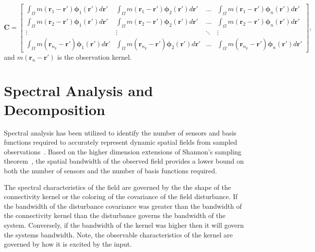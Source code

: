 \documentclass[onecolumn,draftcls]{IEEEtran}
\begin{document}
\begin{equation}
\mathbf C=\begin{bmatrix}\int_{\Omega}m(\mathbf r_1 - \mathbf
r')\boldsymbol \phi_1(\mathbf r')d\mathbf r'&\int_{\Omega}m(\mathbf r_1
- \mathbf r')\boldsymbol \phi_2(\mathbf r')d\mathbf r'& \hdots
&\int_{\Omega}m(\mathbf r_1 - \mathbf r')\boldsymbol \phi_n(\mathbf
r')d\mathbf r' \\
\int_{\Omega}m(\mathbf r_2 - \mathbf r')\boldsymbol \phi_1(\mathbf
r')d\mathbf r'&\int_{\Omega}m(\mathbf r_2 - \mathbf r')\boldsymbol
\phi_2(\mathbf r')d\mathbf r'& \hdots &\int_{\Omega}m(\mathbf r_2 -
\mathbf r')\boldsymbol \phi_n(\mathbf r')d\mathbf r'\\
\vdots&\vdots&\ddots&\vdots\\
\int_{\Omega}m(\mathbf r_{n_y} - \mathbf r')\boldsymbol \phi_1(\mathbf
r')d\mathbf r'&\int_{\Omega}m(\mathbf r_{n_y} - \mathbf r')\boldsymbol
\phi_2(\mathbf r')d\mathbf r'& \hdots &\int_{\Omega}m(\mathbf r_{n_y} -
\mathbf r')\boldsymbol \phi_n(\mathbf r')d\mathbf r'
\end{bmatrix},
\end{equation}
and $m(\mathbf r_n - \mathbf{r}')$ is the observation kernel.

\section{Spectral Analysis and Decomposition}\label{SpectralAnalysisSection}

Spectral analysis has been utilized to identify the number of sensors and basis functions required to accurately represent dynamic spatial fields from sampled observations~\cite{Sanner1992,Scerri2009}. Based on the higher dimension extensions of Shannon's sampling theorem~\cite{Peterson1962}, the spatial bandwidth of the observed field provides a lower bound on both the number of sensors and the number of basis functions required.  

The spectral characteristics of the field are governed by the the shape of the connectivity kernel or the coloring of the covariance of the field disturbance. If the bandwidth of the disturbance covariance was greater than the bandwidth of the connectivity kernel than the disturbance governs the bandwidth of the system. Conversely, if the bandwidth of the kernel was higher then it will govern the systems bandwidth. Note, the observable characteristics of the kernel are governed by how it is excited by the input. 
 
\end{document}

